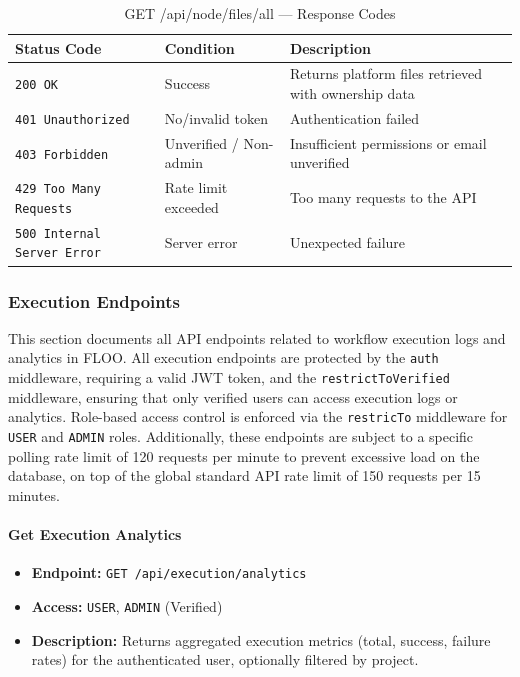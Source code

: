 \begin{table}[H]
\centering
\renewcommand{\arraystretch}{1.3}
\begin{tabularx}{\textwidth}{|l|l|X|}
\hline
\textbf{Status Code} & \textbf{Condition} & \textbf{Description} \\
\hline
\texttt{200 OK}           & Success          & Returns platform files retrieved with ownership data \\
\hline
\texttt{401 Unauthorized} & No/invalid token & Authentication failed \\
\hline
\texttt{403 Forbidden}    & Unverified / Non-admin   & Insufficient permissions or email unverified \\
\hline
\texttt{429 Too Many Requests} & Rate limit exceeded & Too many requests to the API \\
\hline
\texttt{500 Internal Server Error} & Server error & Unexpected failure \\
\hline
\end{tabularx}
\caption{GET /api/node/files/all — Response Codes}
\label{tab:get-all-platform-files-responses}
\end{table}
\FloatBarrier

\subsubsection{Execution Endpoints}
\label{subsec:execution-endpoints}

This section documents all API endpoints related to workflow execution logs and analytics in FLOO.
All execution endpoints are protected by the \texttt{auth} middleware, requiring a valid JWT token, and the \texttt{restrictToVerified} middleware, ensuring that only verified users can access execution logs or analytics.
Role-based access control is enforced via the \texttt{restricTo} middleware for \texttt{USER} and \texttt{ADMIN} roles.
Additionally, these endpoints are subject to a specific polling rate limit of 120 requests per minute to prevent excessive load on the database, on top of the global standard API rate limit of 150 requests per 15 minutes.

\paragraph{Get Execution Analytics}
\label{subsubsec:get-execution-analytics}

\begin{itemize}
  \item \textbf{Endpoint:} \texttt{GET /api/execution/analytics}
  \item \textbf{Access:} \texttt{USER}, \texttt{ADMIN} (Verified)
  \item \textbf{Description:} Returns aggregated execution metrics (total, success, failure rates) for the authenticated user, optionally filtered by project.
\end{itemize}

